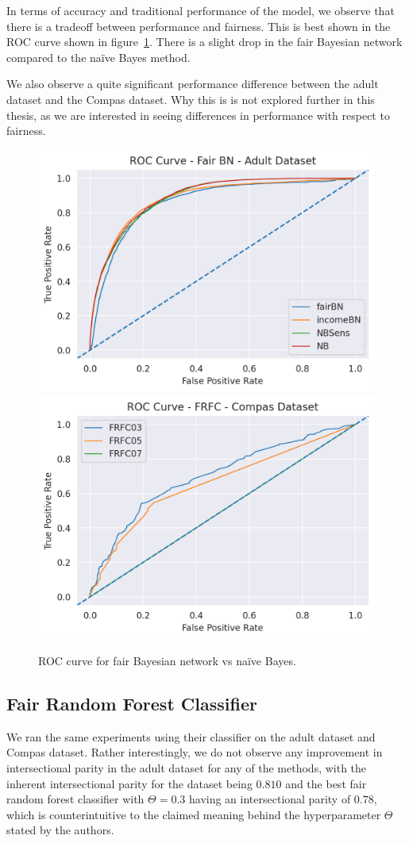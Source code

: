 In terms of accuracy and traditional performance of the model, we observe that there is a tradeoff between performance and fairness. This is best shown in the ROC curve shown in figure~\ref{fig:exp1fairBNROC}. There is a slight drop in the fair Bayesian network compared to the naïve Bayes method.

We also observe a quite significant performance difference between the adult dataset and the Compas dataset. Why this is is not explored further in this thesis, as we are interested in seeing differences in performance with respect to fairness.  
\begin{figure}
    \centering
    \includegraphics[width=0.49\linewidth]{figures/adult_fairbn_roc.png}
    \includegraphics[width=0.49\linewidth]{figures/compas_frfc_roc.png}
    \caption{ROC curve for fair Bayesian network vs naïve Bayes.}
    \label{fig:exp1fairBNROC}
\end{figure}

\subsection{Fair Random Forest Classifier}

We ran the same experiments using their classifier on the adult dataset and Compas dataset. Rather interestingly, we do not observe any improvement in intersectional parity in the adult dataset for any of the methods, with the inherent intersectional parity for the dataset being $0.810$ and the best fair random forest classifier with $\Theta = 0.3$ having an intersectional parity of $0.78$, which is counterintuitive to the claimed meaning behind the hyperparameter $\Theta$ stated by the authors.

